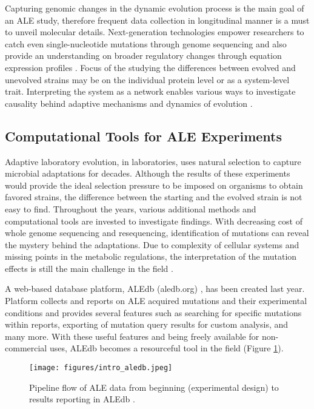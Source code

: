 Capturing genomic changes in the dynamic evolution process is the main goal of an ALE study, therefore frequent data collection in longitudinal manner is a must to unveil molecular details. Next-generation technologies empower researchers to catch even single-nucleotide mutations through genome sequencing and also provide an understanding on broader regulatory changes through equation expression profiles \cite{conrad2011microbial}. Focus of the studying the differences between evolved and unevolved strains may be on the individual protein level or as a system-level trait. Interpreting the system as a network enables various ways to investigate causality behind adaptive mechanisms and dynamics of evolution \cite{soyer2013evolutionary, long2018adaptive}.

\subsection{Computational Tools for ALE Experiments}

Adaptive laboratory evolution, in laboratories, uses natural selection to capture microbial adaptations for decades. Although the results of these experiments would provide the ideal selection pressure to be imposed on organisms to obtain favored strains, the difference between the starting and the evolved strain is not easy to find. Throughout the years, various additional methods and computational tools are invested to investigate findings. With decreasing cost of whole genome sequencing and resequencing, identification of mutations can reveal the mystery behind the adaptations. Due to complexity of cellular systems and missing points in the metabolic regulations, the interpretation of the mutation effects is still the main challenge in the field \cite{palsson2011adaptive}.

A web-based database platform, ALEdb (aledb.org) \cite{phaneuf2019aledb}, has been created last year. Platform collects and reports on ALE acquired mutations and their experimental conditions and provides several features such as searching for specific mutations within reports, exporting of mutation query results for custom analysis, and many more. With these useful features and being freely available for non-commercial uses, ALEdb becomes a resourceful tool in the field (Figure \ref{fig:intro_aledb}).
\vspace{1cm}
\begin{figure}[H]
\begin{center}
\texttt{[image: figures/intro\_aledb.jpeg]}
\caption[Pipeline flow of ALE data from beginning (experimental design) to results reporting in ALEdb \cite{phaneuf2019aledb}.]{Pipeline flow of ALE data from beginning (experimental design) to results reporting in ALEdb \cite{phaneuf2019aledb}.}
\label{fig:intro_aledb}
\end{center}
\end{figure}

